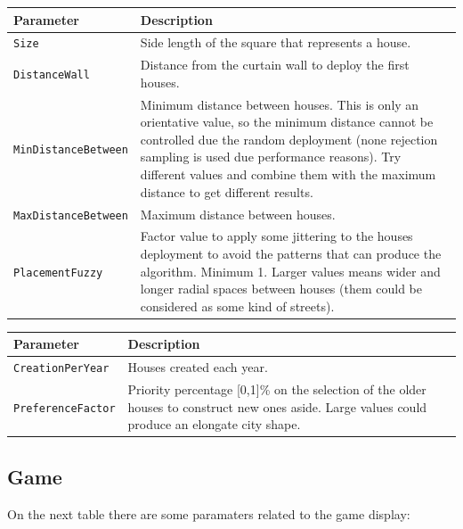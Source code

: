 \documentclass[tog]{acmsiggraph}
\begin{document}
\begin{tabularx}{0.48\textwidth}{ |X|X| }
\hline 
\textbf{Parameter} & \textbf{Description} \\[0.15cm]
 \hline
  \texttt{Size} & Side length of the square that represents a house.\\
 \hline
 \texttt{DistanceWall} & Distance from the curtain wall to deploy the first houses. \\
 \hline
 \texttt{MinDistanceBetween} & Minimum distance between houses. This is only an orientative value, so the minimum distance cannot be controlled due the random deployment (none rejection sampling is used due performance reasons). Try different values and combine them with the maximum distance to get different results. \\
 \hline 
 \texttt{MaxDistanceBetween} & Maximum distance between houses.  \\
 \hline
 \texttt{PlacementFuzzy} & Factor value to apply some jittering to the houses deployment to avoid the patterns that can produce the algorithm. Minimum 1. Larger values means wider and longer radial spaces between houses (them could be considered as some kind of streets). \\
 \hline
\end{tabularx}  
 
\begin{tabularx}{0.48\textwidth}{ |l|X| }
\hline 
\textbf{Parameter} & \textbf{Description} \\[0.15cm]
 \hline
 \texttt{CreationPerYear} & Houses created each year. \\
 \hline
 \texttt{PreferenceFactor} & Priority percentage [0,1]\% on the selection of the older houses to construct new ones aside. Large values could produce an elongate city shape.\\
 \hline
\end{tabularx}




\subsection{Game}
\label{sec:settingsgame}

On the next table there are some paramaters related to the game display:
\end{document}
